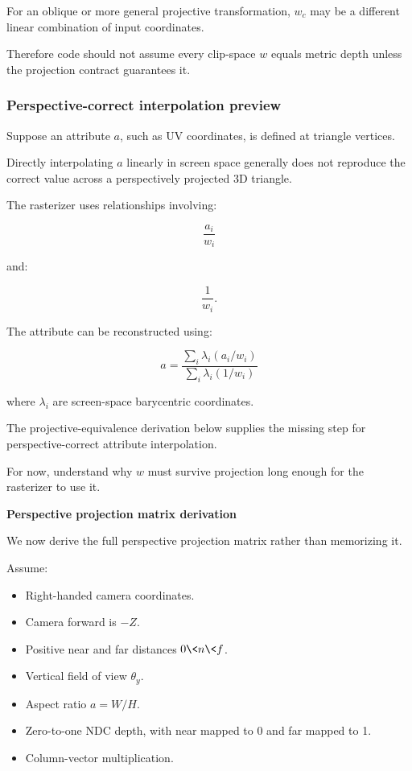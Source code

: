 For an oblique or more general projective transformation, \(w_c\) may be a different linear combination of input coordinates.

Therefore code should not assume every clip-space \(w\) equals metric depth unless the projection contract guarantees it.

\subsubsection{Perspective-correct interpolation preview}\label{perspective-correct-interpolation-preview}

Suppose an attribute \(a\), such as UV coordinates, is defined at triangle vertices.

Directly interpolating \(a\) linearly in screen space generally does not reproduce the correct value across a perspectively projected 3D triangle.

The rasterizer uses relationships involving:

\[
 \frac{a_i}{w_i}
\]

and:

\[
 \frac1{w_i}.
\]

The attribute can be reconstructed using:

\[
 \boxed{ a= \frac{ \sum_i\lambda_i(a_i/w_i) }{ \sum_i\lambda_i(1/w_i) } }
\]

where \(\lambda_i\) are screen-space barycentric coordinates.

The projective-equivalence derivation below supplies the missing step for perspective-correct attribute interpolation.

For now, understand why \(w\) must survive projection long enough for the rasterizer to use it.

\textbf{Perspective projection matrix derivation}

We now derive the full perspective projection matrix rather than memorizing it.

Assume:

\begin{itemize}
\tightlist
\item
  Right-handed camera coordinates.
\item
  Camera forward is \(-Z\).
\item
  Positive near and far distances \(0\<n\<f\).
\item
  Vertical field of view \(\theta_y\).
\item
  Aspect ratio \(a=W/H\).
\item
  Zero-to-one NDC depth, with near mapped to 0 and far mapped to 1.
\item
  Column-vector multiplication.
\end{itemize}

